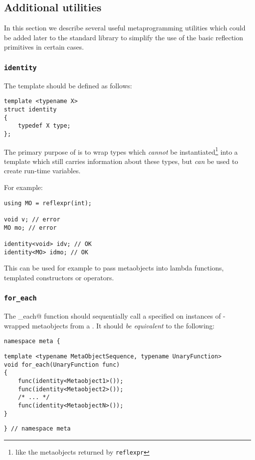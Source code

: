 \subsection{Additional utilities}
\label{fut-facade}

In this section we describe several useful metaprogramming utilities which
could be added later to the standard library to simplify the use of the basic
reflection primitives in certain cases.
 
\subsubsection{\texttt{identity}}
\label{fac-identity}

The \verb@identity@ template should be defined as follows:

\begin{verbatim}
template <typename X>
struct identity
{
	typedef X type;
};
\end{verbatim}

The primary purpose of \verb@identity@ is to wrap types which {\em cannot} be
instantiated\footnote{like the metaobjects returned by \texttt{reflexpr}}
into a template which still carries information about these types, but
{\em can} be used to create run-time variables.

For example:

\begin{verbatim}
using MO = reflexpr(int);

void v; // error
MO mo; // error

identity<void> idv; // OK
identity<MO> idmo; // OK
\end{verbatim}
 
This can be used for example to pass metaobjects into lambda functions,
templated constructors or operators. 

\subsubsection{\texttt{for\_each}}
\label{fac-for-each}

The \verb@for_each@ function should sequentially call a specified
\verb@UnaryFunction@ on instances of \verb@identity@-wrapped metaobjects from
a . It should {\em be equivalent} to the following:

\begin{verbatim}
namespace meta {
\end{verbatim}
\begin{verbatim}
template <typename MetaObjectSequence, typename UnaryFunction>
void for_each(UnaryFunction func)
{
	func(identity<Metaobject1>());
	func(identity<Metaobject2>());
	/* ... */
	func(identity<MetaobjectN>());
}
\end{verbatim}
\begin{verbatim}
} // namespace meta
\end{verbatim}

